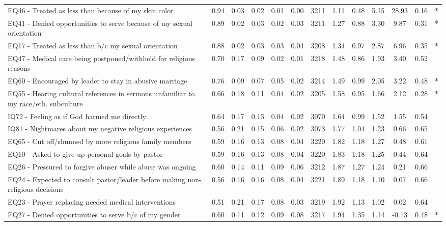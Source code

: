 \documentclass[
  letterpaper,
  DIV=11,
  numbers=noendperiod]{scrreport}
\begin{document}
\begin{longtable}[t]{>{\raggedright\arraybackslash}p{2cm}cccccccccccc}
\endfoot
\bottomrule
\endlastfoot
EQ46 - Treated as less than because of my skin color & 0.94 & 0.03 & 0.02 & 0.01 & 0.00 & 3211 & 1.11 & 0.48 & 5.15 & 28.93 & 0.16 & *\\
EQ41 - Denied opportunities to serve because of my sexual orientation & 0.89 & 0.02 & 0.03 & 0.02 & 0.03 & 3211 & 1.27 & 0.88 & 3.30 & 9.87 & 0.31 & *\\
EQ17 - Treated as less than b/c my sexual orientation & 0.88 & 0.02 & 0.03 & 0.03 & 0.04 & 3208 & 1.34 & 0.97 & 2.87 & 6.96 & 0.35 & *\\
EQ47 - Medical care being postponed/withheld for religious reasons & 0.70 & 0.17 & 0.09 & 0.02 & 0.01 & 3218 & 1.48 & 0.86 & 1.93 & 3.40 & 0.52 & \\
EQ60 - Encouraged by leader to stay in abusive marriage & 0.76 & 0.09 & 0.07 & 0.05 & 0.02 & 3214 & 1.49 & 0.99 & 2.05 & 3.22 & 0.48 & *\\
\addlinespace
EQ55 - Hearing cultural references in sermons unfamiliar to my race/eth. subculture & 0.66 & 0.18 & 0.11 & 0.04 & 0.02 & 3205 & 1.58 & 0.95 & 1.66 & 2.12 & 0.28 & *\\
IQ72 - Feeling as if God harmed me directly & 0.64 & 0.17 & 0.13 & 0.04 & 0.02 & 3070 & 1.64 & 0.99 & 1.52 & 1.55 & 0.54 & \\
IQ81 - Nightmares about my negative religious experiences & 0.56 & 0.21 & 0.15 & 0.06 & 0.02 & 3073 & 1.77 & 1.04 & 1.23 & 0.66 & 0.65 & \\
EQ65 - Cut off/shunned by more religious family members & 0.59 & 0.16 & 0.13 & 0.08 & 0.04 & 3220 & 1.82 & 1.18 & 1.27 & 0.48 & 0.61 & \\
EQ10 - Asked to give up personal goals by pastor & 0.59 & 0.16 & 0.13 & 0.08 & 0.04 & 3220 & 1.83 & 1.18 & 1.25 & 0.44 & 0.64 & \\
\addlinespace
EQ26 - Pressured to forgive abuser while abuse was ongoing & 0.60 & 0.14 & 0.11 & 0.09 & 0.06 & 3212 & 1.87 & 1.27 & 1.24 & 0.21 & 0.66 & \\
EQ24 - Expected to consult pastor/leader before making non-religious decisions & 0.56 & 0.16 & 0.16 & 0.08 & 0.04 & 3221 & 1.89 & 1.18 & 1.10 & 0.07 & 0.66 & \\
EQ23 - Prayer replacing needed medical interventions & 0.51 & 0.21 & 0.17 & 0.08 & 0.03 & 3219 & 1.92 & 1.13 & 1.02 & 0.02 & 0.64 & \\
EQ27 - Denied opportunities to serve b/c of my gender & 0.60 & 0.11 & 0.12 & 0.09 & 0.08 & 3217 & 1.94 & 1.35 & 1.14 & -0.13 & 0.48 & *\\

\end{longtable}
\end{document}
